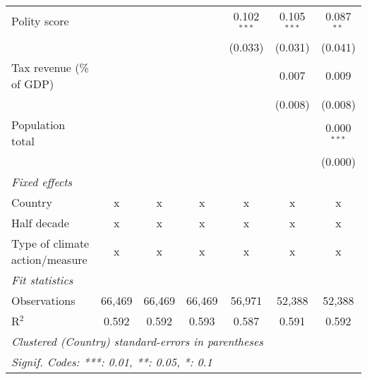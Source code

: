 \begin{tabular}{lcccccc}
   Polity score                                                      &         &                &                & 0.102$^{***}$  & 0.105$^{***}$  & 0.087$^{**}$\\   
                                                                     &         &                &                & (0.033)        & (0.031)        & (0.041)\\   
   Tax revenue (\% of GDP)                                           &         &                &                &                & 0.007          & 0.009\\   
                                                                     &         &                &                &                & (0.008)        & (0.008)\\   
   Population total                                                  &         &                &                &                &                & 0.000$^{***}$\\   
                                                                     &         &                &                &                &                & (0.000)\\   
   \emph{Fixed effects}\\
   Country                                                           & x       & x              & x              & x              & x              & x\\  
   Half decade                                                       & x       & x              & x              & x              & x              & x\\  
   Type of climate action/measure                                    & x       & x              & x              & x              & x              & x\\  
   \midrule \emph{Fit statistics}\\
   Observations                                                      & 66,469  & 66,469         & 66,469         & 56,971         & 52,388         & 52,388\\  
   R$^2$                                                             & 0.592   & 0.592          & 0.593          & 0.587          & 0.591          & 0.592\\  
   \midrule
   \multicolumn{7}{l}{\emph{Clustered (Country) standard-errors in parentheses}}\\
   \multicolumn{7}{l}{\emph{Signif. Codes: ***: 0.01, **: 0.05, *: 0.1}}\\
\end{tabular}
\par\endgroup


